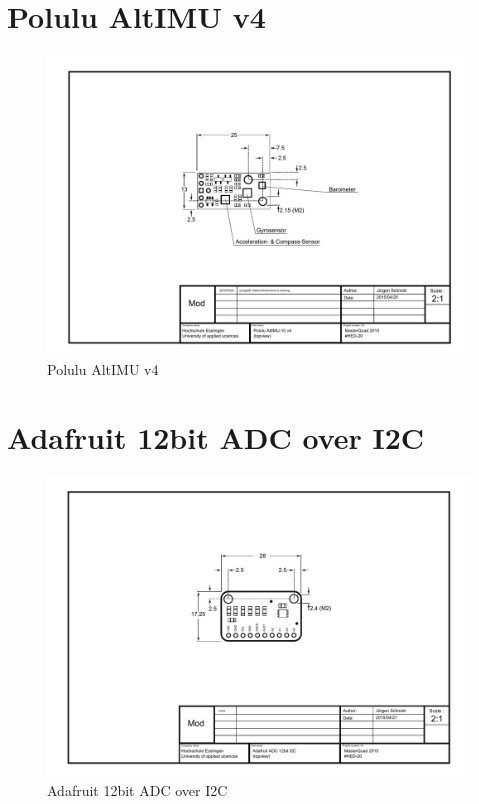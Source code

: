 \newpage
\section{Polulu AltIMU v4}
\label{sec:goals:altimu}
\begin{figure}[H]
    \centering
    \includegraphics[width=\textwidth]{fig/ch-rpi-hardware/A4_tech_draw_topview_imu}
    \caption{Polulu AltIMU v4}
    \label{fig:parts:imu_topview}
\end{figure}

\newpage
\section{Adafruit 12bit ADC over I2C}
\label{sec:goals:adc}
\begin{figure}[H]
    \centering
    \includegraphics[width=\textwidth]{fig/ch-rpi-hardware/A4_tech_draw_topview_adc}
    \caption{Adafruit 12bit ADC over I2C}
    \label{fig:parts:adc_topview}
\end{figure}

